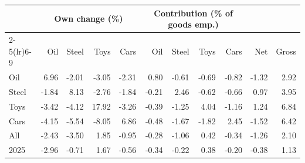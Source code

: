 \begin{tabular}{lrrrrrrrrrr}
\toprule
 & \multicolumn{4}{c}{Own change (\%)} & \multicolumn{4}{c}{Contribution (\% of goods emp.)} & & \\
\cmidrule(lr){2-5}\cmidrule(lr){6-9}
 & Oil & Steel & Toys & Cars & Oil & Steel & Toys & Cars & Net & Gross \\
\midrule
Oil & 6.96 & -2.01 & -3.05 & -2.31 & 0.80 & -0.61 & -0.69 & -0.82 & -1.32 & 2.92 \\
Steel & -1.84 & 8.13 & -2.76 & -1.84 & -0.21 & 2.46 & -0.62 & -0.66 & 0.97 & 3.95 \\
Toys & -3.42 & -4.12 & 17.92 & -3.26 & -0.39 & -1.25 & 4.04 & -1.16 & 1.24 & 6.84 \\
Cars & -4.15 & -5.54 & -8.05 & 6.86 & -0.48 & -1.67 & -1.82 & 2.45 & -1.52 & 6.42 \\
All & -2.43 & -3.50 & 1.85 & -0.95 & -0.28 & -1.06 & 0.42 & -0.34 & -1.26 & 2.10 \\
2025 & -2.96 & -0.71 & 1.67 & -0.56 & -0.34 & -0.22 & 0.38 & -0.20 & -0.38 & 1.13 \\
\bottomrule
\end{tabular}
